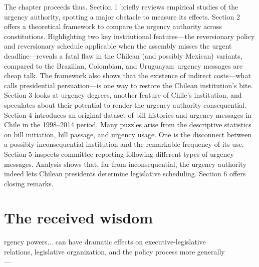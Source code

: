 \documentclass[letter,12pt]{article}
\begin{document}
The chapter proceeds thus. Section 1 briefly reviews empirical studies of the urgency authority, spotting a major obstacle to measure its effects. Section 2 offers a theoretical framework to compare the urgency authority across constitutions. Highlighting two key institutional features---the reversionary policy and reversionary schedule applicable when the assembly misses the urgent deadline---reveals a fatal flaw in the Chilean (and possibly Mexican) variants, compared to the Brazilian, Colombian, and Uruguayan: urgency messages are cheap talk. The framework also shows that the existence of indirect costs---what \citep{neustadt.1990} calls presidential persuation---is one way to restore the Chilean institution's bite. Section 3 looks at urgency degrees, another feature of Chile's institution, and speculates about their potential to render the urgency authority consequential. Section 4 introduces an original dataset of bill histories and urgency messages in Chile in the 1998--2014 period. Many puzzles arise from the descriptive statistics on bill initiation, bill passage, and urgency usage. One is the disconnect between a possibly inconsequential institution and the remarkable frequency of its use. Section 5 inspects committee reporting following different types of urgency messages. Analysis shows that, far from inconsequential, the urgency authority indeed lets Chilean presidents determine legislative scheduling. Section 6 offers closing remarks. 

\section{The received wisdom}

\begin{center}
\singlespacing
[U]rgency powers... can have dramatic effects on executive-legislative \\ 
relations, legislative organization, and the policy process more generally\\ 
---\citet[][:438]{morgenstern.2002b}
\end{center}
\onehalfspacing

\end{document}
